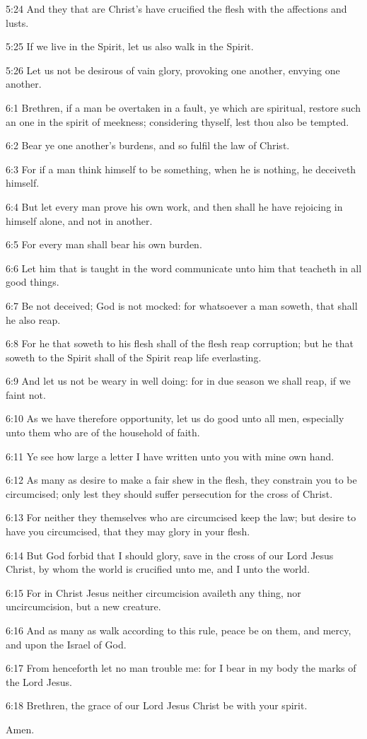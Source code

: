 5:24 And they that are Christ's have crucified the flesh with the affections and lusts.

5:25 If we live in the Spirit, let us also walk in the Spirit.

5:26 Let us not be desirous of vain glory, provoking one another, envying one another.

6:1 Brethren, if a man be overtaken in a fault, ye which are spiritual, restore such an one in the spirit of meekness; considering thyself, lest thou also be tempted.

6:2 Bear ye one another's burdens, and so fulfil the law of Christ.

6:3 For if a man think himself to be something, when he is nothing, he deceiveth himself.

6:4 But let every man prove his own work, and then shall he have rejoicing in himself alone, and not in another.

6:5 For every man shall bear his own burden.

6:6 Let him that is taught in the word communicate unto him that teacheth in all good things.

6:7 Be not deceived; God is not mocked: for whatsoever a man soweth, that shall he also reap.

6:8 For he that soweth to his flesh shall of the flesh reap corruption; but he that soweth to the Spirit shall of the Spirit reap life everlasting.

6:9 And let us not be weary in well doing: for in due season we shall reap, if we faint not.

6:10 As we have therefore opportunity, let us do good unto all men, especially unto them who are of the household of faith.

6:11 Ye see how large a letter I have written unto you with mine own hand.

6:12 As many as desire to make a fair shew in the flesh, they constrain you to be circumcised; only lest they should suffer persecution for the cross of Christ.

6:13 For neither they themselves who are circumcised keep the law; but desire to have you circumcised, that they may glory in your flesh.

6:14 But God forbid that I should glory, save in the cross of our Lord Jesus Christ, by whom the world is crucified unto me, and I unto the world.

6:15 For in Christ Jesus neither circumcision availeth any thing, nor uncircumcision, but a new creature.

6:16 And as many as walk according to this rule, peace be on them, and mercy, and upon the Israel of God.

6:17 From henceforth let no man trouble me: for I bear in my body the marks of the Lord Jesus.

6:18 Brethren, the grace of our Lord Jesus Christ be with your spirit.

Amen.

